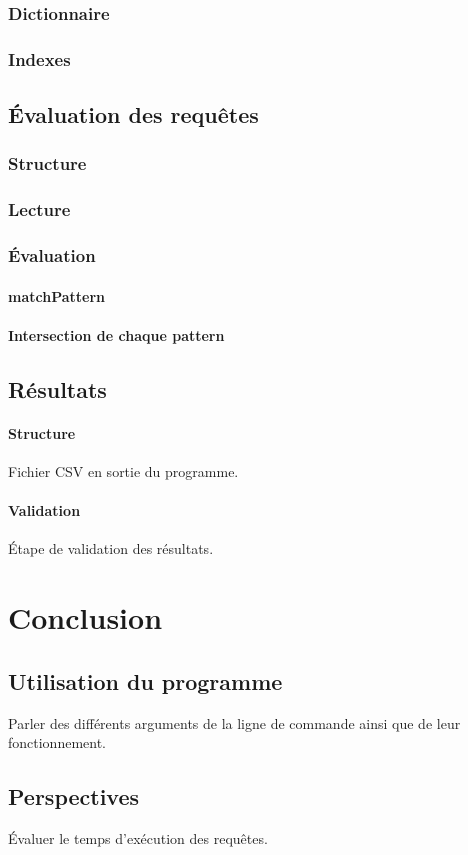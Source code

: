\documentclass[12pt,titlepage]{article}
\begin{document}
\subsubsection{Dictionnaire}

\subsubsection{Indexes}

\subsection{Évaluation des requêtes}

\subsubsection{Structure}

\subsubsection{Lecture}

\subsubsection{Évaluation}

\paragraph{matchPattern}

\paragraph{Intersection de chaque pattern}

\subsection{Résultats}

\paragraph{Structure}

Fichier CSV en sortie du programme.

\paragraph{Validation}

Étape de validation des résultats.

\section{Conclusion}

\subsection{Utilisation du programme}

Parler des différents arguments de la ligne de commande ainsi que de leur fonctionnement.

\subsection{Perspectives}

Évaluer le temps d'exécution des requêtes.
\end{document}
